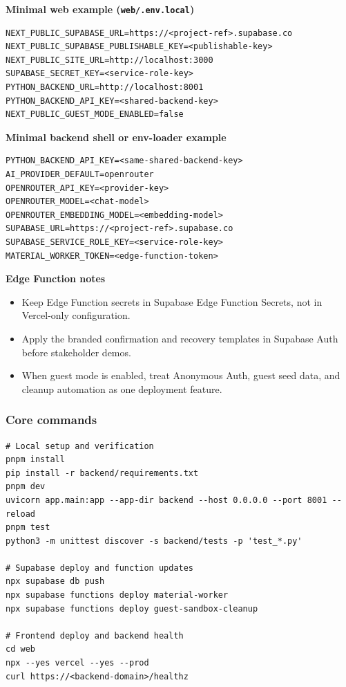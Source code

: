 \documentclass[11pt,a4paper]{article}
\begin{document}
\textbf{Minimal web example (\texttt{web/.env.local})}

\begin{verbatim}
NEXT_PUBLIC_SUPABASE_URL=https://<project-ref>.supabase.co
NEXT_PUBLIC_SUPABASE_PUBLISHABLE_KEY=<publishable-key>
NEXT_PUBLIC_SITE_URL=http://localhost:3000
SUPABASE_SECRET_KEY=<service-role-key>
PYTHON_BACKEND_URL=http://localhost:8001
PYTHON_BACKEND_API_KEY=<shared-backend-key>
NEXT_PUBLIC_GUEST_MODE_ENABLED=false
\end{verbatim}

\textbf{Minimal backend shell or env-loader example}

\begin{verbatim}
PYTHON_BACKEND_API_KEY=<same-shared-backend-key>
AI_PROVIDER_DEFAULT=openrouter
OPENROUTER_API_KEY=<provider-key>
OPENROUTER_MODEL=<chat-model>
OPENROUTER_EMBEDDING_MODEL=<embedding-model>
SUPABASE_URL=https://<project-ref>.supabase.co
SUPABASE_SERVICE_ROLE_KEY=<service-role-key>
MATERIAL_WORKER_TOKEN=<edge-function-token>
\end{verbatim}

\textbf{Edge Function notes}
\begin{itemize}
  \item Keep Edge Function secrets in Supabase Edge Function Secrets, not in Vercel-only configuration.
  \item Apply the branded confirmation and recovery templates in Supabase Auth before stakeholder demos.
  \item When guest mode is enabled, treat Anonymous Auth, guest seed data, and cleanup automation as one deployment feature.
\end{itemize}

\subsubsection*{Core commands}

\begin{verbatim}
# Local setup and verification
pnpm install
pip install -r backend/requirements.txt
pnpm dev
uvicorn app.main:app --app-dir backend --host 0.0.0.0 --port 8001 --reload
pnpm test
python3 -m unittest discover -s backend/tests -p 'test_*.py'

# Supabase deploy and function updates
npx supabase db push
npx supabase functions deploy material-worker
npx supabase functions deploy guest-sandbox-cleanup

# Frontend deploy and backend health
cd web
npx --yes vercel --yes --prod
curl https://<backend-domain>/healthz
\end{verbatim}
\end{document}
